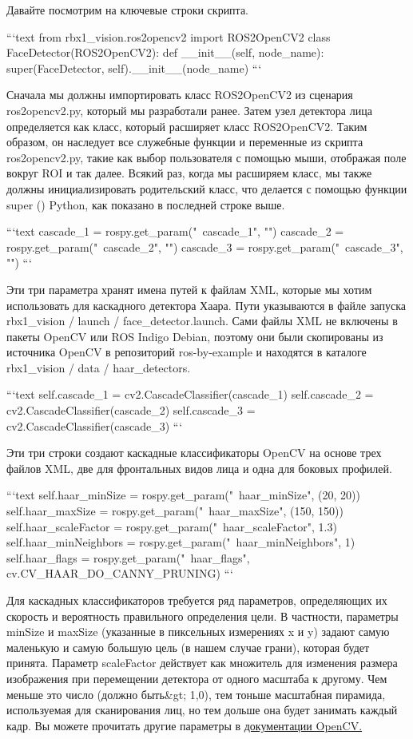Давайте посмотрим на ключевые строки скрипта.

```text
from rbx1_vision.ros2opencv2 import ROS2OpenCV2 
class FaceDetector(ROS2OpenCV2):
def __init__(self, node_name):
super(FaceDetector, self).__init__(node_name)
```

Сначала мы должны импортировать класс ROS2OpenCV2 из сценария ros2opencv2.py, который мы разработали ранее. Затем узел детектора лица определяется как класс, который расширяет класс ROS2OpenCV2. Таким образом, он наследует все служебные функции и переменные из скрипта ros2opencv2.py, такие как выбор пользователя с помощью мыши, отображая поле вокруг ROI и так далее. Всякий раз, когда мы расширяем класс, мы также должны инициализировать родительский класс, что делается с помощью функции super () Python, как показано в последней строке выше.

```text
cascade_1 = rospy.get_param("~cascade_1", "")
cascade_2 = rospy.get_param("~cascade_2", "")
cascade_3 = rospy.get_param("~cascade_3", "")
```

Эти три параметра хранят имена путей к файлам XML, которые мы хотим использовать для каскадного детектора Хаара. Пути указываются в файле запуска rbx1\_vision / launch / face\_detector.launch. Сами файлы XML не включены в пакеты OpenCV или ROS Indigo Debian, поэтому они были скопированы из источника OpenCV в репозиторий ros-by-example и находятся в каталоге rbx1\_vision / data / haar\_detectors.

```text
self.cascade_1 = cv2.CascadeClassifier(cascade_1)
self.cascade_2 = cv2.CascadeClassifier(cascade_2)
self.cascade_3 = cv2.CascadeClassifier(cascade_3)
```

Эти три строки создают каскадные классификаторы OpenCV на основе трех файлов XML, две для фронтальных видов лица и одна для боковых профилей.

```text
self.haar_minSize = rospy.get_param("~haar_minSize", (20, 20))
self.haar_maxSize = rospy.get_param("~haar_maxSize", (150, 150))
self.haar_scaleFactor = rospy.get_param("~haar_scaleFactor", 1.3)
self.haar_minNeighbors = rospy.get_param("~haar_minNeighbors", 1)
self.haar_flags = rospy.get_param("~haar_flags",
cv.CV_HAAR_DO_CANNY_PRUNING)
```

Для каскадных классификаторов требуется ряд параметров, определяющих их скорость и вероятность правильного определения цели. В частности, параметры minSize и maxSize (указанные в пиксельных измерениях x и y) задают самую маленькую и самую большую цель (в нашем случае грани), которая будет принята. Параметр scaleFactor действует как множитель для изменения размера изображения при перемещении детектора от одного масштаба к другому. Чем меньше это число (должно быть&gt; 1,0), тем тоньше масштабная пирамида, используемая для сканирования лиц, но тем дольше она будет занимать каждый кадр. Вы можете прочитать другие параметры в \href{http://docs.opencv.org/modules/objdetect/doc/cascade_classification.html?highlight=cascade%23cv2.CascadeClassifier}{документации OpenCV.}

